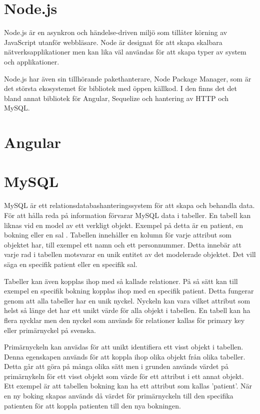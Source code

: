 \section{Node.js}
Node.js är en asynkron och händelse-driven miljö som tillåter körning av JavaScript utanför webbläsare. Node är designat för att skapa skalbara nätverksapplikationer men kan lika väl användas för att skapa typer av system och applikationer. \cite{nodejs}

Node.js har även sin tillhörande pakethanterare, Node Package Manager, som är det största ekosystemet för bibliotek med öppen källkod. \cite{npm}
I den finns det det bland annat bibliotek för Angular, Sequelize och hantering av HTTP och MySQL.

\section{Angular}

\section{MySQL}
MySQL är ett relationsdatabashanteringssystem för att skapa och behandla data. För att hålla reda på 
information förvarar MySQL data i tabeller. En tabell kan liknas vid en model av ett verkligt objekt. 
Exempel på detta är en patient, en bokning eller en sal \cite{mysql}. Tabellen innehåller en kolumn för varje 
attribut som objektet har, till exempel ett namn och ett personnummer. Detta innebär att varje rad i 
tabellen motsvarar en unik entitet av det modelerade objektet. Det vill säga en specifik patient eller 
en specifik sal.

Tabeller kan även kopplas ihop med så kallade relationer. På så sätt kan till exempel en specifik bokning kopplas ihop med en specifik patient. Detta fungerar genom att alla tabeller har en unik nyckel. Nyckeln kan vara vilket attribut som helst så länge det har ett unikt värde för alla objekt i tabellen. En tabell kan ha flera nycklar men den nyckel som används för relationer kallas för primary key eller primärnyckel på svenska. 

Primärnyckeln kan anvädas för att unikt identifiera ett visst objekt i tabellen. Denna egenskapen används för att koppla ihop olika objekt från olika tabeller. Detta går att göra på många olika sätt men i grunden används värdet på primärnykeln för ett visst objekt som värde för ett attribut i ett annat objekt. Ett exempel är att tabellen bokning kan ha ett attribut som kallas 'patient'. När en ny boking skapas används då värdet för primärnyckeln till den specifika patienten för att koppla patienten till den nya bokningen.

